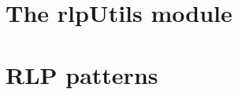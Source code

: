 \documentclass[fleqn]{report}
\begin{document}
\chapter{The rlpUtils module}                  \label{chap: utils rlp}       \minitoc    


\appendix
\chapter{RLP patterns}                               \label{chap: RLP patterns}    \minitoc    
\printbibliography
\end{document}
